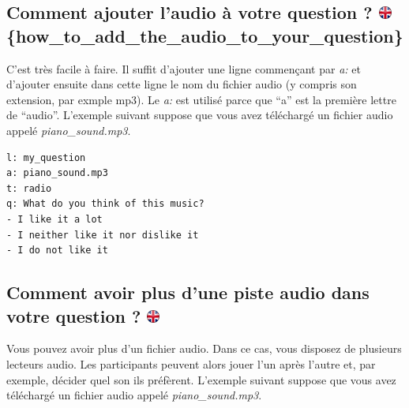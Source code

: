 \documentclass[
]{book}
\begin{document}
\hypertarget{comment-ajouter-laudio-uxe0-votre-question-how_to_add_the_audio_to_your_question}{%
\subsection[Comment ajouter l'audio à votre question ? \{how\_to\_add\_the\_audio\_to\_your\_question\}]{\texorpdfstring{Comment ajouter l'audio à votre question ? \href{https://www.psytoolkit.org/lessons/surveyaudiovideo.html\#_how_to_add_the_audio_to_your_question}{\protect\includegraphics{img/ukflag.png}}\{how\_to\_add\_the\_audio\_to\_your\_question\}}{Comment ajouter l'audio à votre question ? \{how\_to\_add\_the\_audio\_to\_your\_question\}}}\label{comment-ajouter-laudio-uxe0-votre-question-how_to_add_the_audio_to_your_question}}

C'est très facile à faire. Il suffit d'ajouter une ligne commençant par \emph{a:} et d'ajouter ensuite dans cette ligne le nom du fichier audio (y compris son extension, par exmple mp3). Le \emph{a:} est utilisé parce que ``a'' est la première lettre de ``audio''. L'exemple suivant suppose que vous avez téléchargé un fichier audio appelé \emph{piano\_sound.mp3}.

\begin{verbatim}
l: my_question
a: piano_sound.mp3
t: radio
q: What do you think of this music?
- I like it a lot
- I neither like it nor dislike it
- I do not like it
\end{verbatim}

\hypertarget{comment-avoir-plus-dune-piste-audio-dans-votre-question}{%
\subsection[Comment avoir plus d'une piste audio dans votre question ? ]{\texorpdfstring{Comment avoir plus d'une piste audio dans votre question ? \href{https://www.psytoolkit.org/lessons/surveyaudiovideo.html\#_how_to_have_more_than_one_audio_track_in_your_question}{\protect\includegraphics{img/ukflag.png}}}{Comment avoir plus d'une piste audio dans votre question ? }}\label{comment-avoir-plus-dune-piste-audio-dans-votre-question}}

Vous pouvez avoir plus d'un fichier audio. Dans ce cas, vous disposez de plusieurs lecteurs audio. Les participants peuvent alors jouer l'un après l'autre et, par exemple, décider quel son ils préfèrent. L'exemple suivant suppose que vous avez téléchargé un fichier audio appelé \emph{piano\_sound.mp3}.
\end{document}
